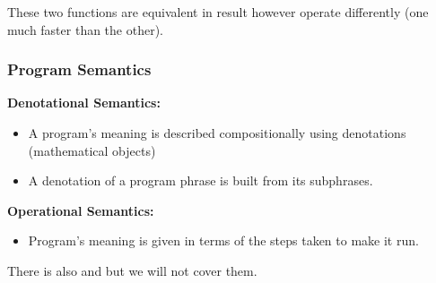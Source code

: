 \documentclass{report}
\begin{document}
            These two functions are equivalent in result however operate differently (one much faster than the other).

        \subsubsection*{Program Semantics}
            \textbf{Denotational Semantics:}
            \begin{itemize}
                \item A program's meaning is described compositionally using denotations (mathematical objects)
                \item A denotation of a program phrase is built from its subphrases.
            \end{itemize}
            \textbf{Operational Semantics:}
            \begin{itemize}
                \item Program's meaning is given in terms of the steps taken to make it run.
            \end{itemize}
            There is also  and  but we will not cover them.
\end{document}
